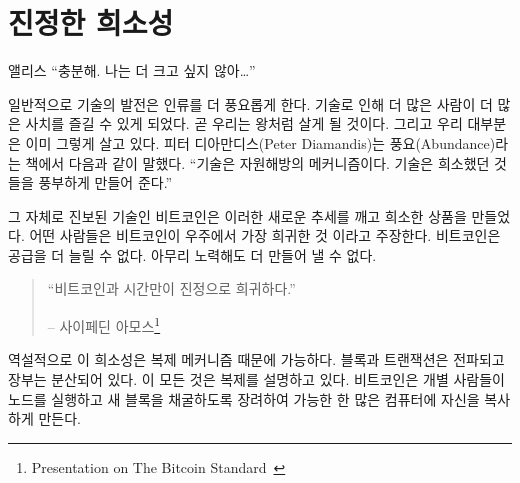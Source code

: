 
\chapter{진정한 희소성}
\label{les:2}

\begin{chapquote}{앨리스}
	\enquote{충분해. 나는 더 크고 싶지 않아\ldots}
\end{chapquote}


일반적으로 기술의 발전은 인류를 더 풍요롭게 한다. 기술로 인해 더 많은 사람이 더 많은 사치를 즐길 수 있게 되었다.
곧 우리는 왕처럼 살게 될 것이다. 그리고 우리 대부분은 이미 그렇게 살고 있다.
피터 디아만디스(Peter Diamandis)는 풍요(Abundance)라는 책에서 다음과 같이 말했다\cite{abundance}. \enquote{기술은 자원해방의 메커니즘이다.
	기술은 희소했던 것들을 풍부하게 만들어 준다.}

그 자체로 진보된 기술인 비트코인은 이러한 새로운 추세를 깨고 희소한 상품을 만들었다. 
어떤 사람들은 비트코인이 우주에서 가장 희귀한 것 이라고 주장한다.
비트코인은 공급을 더 늘릴 수 없다. 아무리 노력해도 더 만들어 낼 수 없다.

\begin{quotation}\begin{samepage}
		\enquote{비트코인과 시간만이 진정으로 희귀하다.}
		\begin{flushright} -- 사이페딘 아모스\footnote{Presentation on The Bitcoin Standard~\cite{bitcoinstandard-pres}}
\end{flushright}\end{samepage}\end{quotation}

역설적으로 이 희소성은 복제 메커니즘 때문에 가능하다. 
블록과 트랜잭션은 전파되고 장부는 분산되어 있다. 
이 모든 것은 복제를 설명하고 있다. 
비트코인은 개별 사람들이 노드를 실행하고 새 블록을 채굴하도록 장려하여 
가능한 한 많은 컴퓨터에 자신을 복사하게 만든다.

